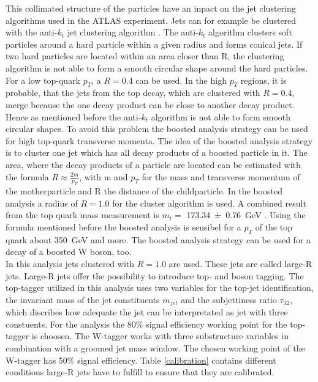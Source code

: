 This collimated structure of the particles have an inpact on the jet clustering algorithms used in the ATLAS experiment.
Jets can for example be clustered with the anti-$k_{t}$ jet clustering algorithm \cite{antikt}.  
The anti-$k_{t}$ algorithm clusters soft particles around a hard particle within a given radius and forms conical jets. 
If two hard particles are located within an area closer than R, the clustering algorithm is not able to form a smooth circular shape around the hard particles.  
For a low top-quark $p_{T}$, a $R = 0.4$ can be used.
In the high $p_{T}$ regions, it is probable, that the jets from the top decay, which are clustered with $R = 0.4$,  merge because the one decay product can be close to another decay product. 
Hence as mentioned before the anti-$k_{t}$ algorithm is not able to form smooth circular shapes. 
To avoid this problem the boosted analysis strategy can be used for high top-quark transverse momenta.
The idea of the boosted analysis strategy is to cluster one jet which has all decay products of a boosted particle in it.
The area, where the decay products of a particle are located can be estimated with the formula $R \approx \frac{2m}{p_{T}}$, with m and $p_{T}$ for the mass and transverse momentum of the motherparticle and R the distance of the childparticle.
In the boosted analysis a radius of $R = 1.0$ for the cluster algorithm is used. 
A combined result from the top quark mass measurement is $m_{t} =$ \SI{173.34 \pm 0.76}{GeV} \cite{topmass}.
Using the formula mentioned before the boosted analysis is sensibel for a $p_{T}$ of the top quark about \SI{350}{GeV} and more. 
The boosted analysis strategy can be used for a decay of a boosted W boson, too.\\
In this analysis jets clustered with  $R = 1.0$ are used.   
These jets are called large-R jets. 
Large-R jets offer the possibility to introduce top- and boson tagging.
The top-tagger \cite{toptag} utilized in this analysis uses two variables for the top-jet identification, the invariant mass of the jet constituents $m_{jet}$ and the subjettiness ratio $\tau_{32}$, which discribes how adequate the jet can be interpretated as jet with three constuents.
For the analysis the 80\% signal efficiency working point for the top-tagger is choosen. 
The W-tagger \cite {Wtag} works with three substructure variables in combination with a groomed jet mass window.
The chosen working point of the W-tagger has 50\% signal efficiency. 
Table \ref{calibration} contains different conditions large-R jets have to fulfill to ensure that they are calibrated.

